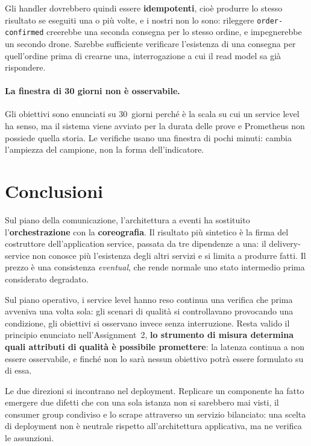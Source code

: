 \documentclass[12pt,a4paper]{article}
\begin{document}
Gli handler dovrebbero quindi essere \textbf{idempotenti}, cio\`e produrre lo stesso risultato se
eseguiti una o pi\`u volte, e i nostri non lo sono: rileggere \texttt{order-confirmed} creerebbe una
seconda consegna per lo stesso ordine, e impegnerebbe un secondo drone. Sarebbe sufficiente
verificare l'esistenza di una consegna per quell'ordine prima di crearne una, interrogazione a cui
il read model sa gi\`a rispondere.

\paragraph{La finestra di 30 giorni non \`e osservabile.} Gli obiettivi sono enunciati su 30~giorni
perch\'e \`e la scala su cui un service level ha senso, ma il sistema viene avviato per la durata
delle prove e Prometheus non possiede quella storia. Le verifiche usano una finestra di pochi
minuti: cambia l'ampiezza del campione, non la forma dell'indicatore.

\section{Conclusioni}

Sul piano della comunicazione, l'architettura a eventi ha sostituito l'\textbf{orchestrazione} con
la \textbf{coreografia}. Il risultato pi\`u sintetico \`e la firma del costruttore
dell'application service, passata da tre dipendenze a una: il delivery-service non conosce pi\`u
l'esistenza degli altri servizi e si limita a produrre fatti. Il prezzo \`e una consistenza
\emph{eventual}, che rende normale uno stato intermedio prima considerato degradato.

Sul piano operativo, i service level hanno reso continua una verifica che prima avveniva una volta
sola: gli scenari di qualit\`a si controllavano provocando una condizione, gli obiettivi si
osservano invece senza interruzione. Resta valido il principio enunciato nell'Assignment~2, \textbf{lo strumento di misura determina
quali attributi di qualit\`a \`e possibile promettere}: la latenza continua a non essere osservabile,
e finch\'e non lo sar\`a nessun obiettivo potr\`a essere formulato su di essa.

Le due direzioni si incontrano nel deployment. Replicare un componente ha fatto emergere due difetti
che con una sola istanza non si sarebbero mai visti, il consumer group condiviso e lo scrape
attraverso un servizio bilanciato: una scelta di deployment non \`e neutrale rispetto
all'architettura applicativa, ma ne verifica le assunzioni.
\end{document}
